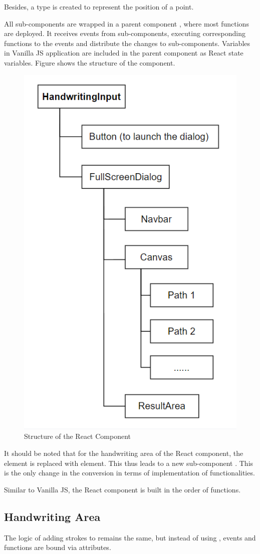 \documentclass[12pt,twoside]{report}
\begin{document}
Besides, a type  is created to represent the position of a point.

All sub-components are wrapped in a parent component ,
where most functions are deployed. It receives events from sub-components, executing corresponding functions to the events and distribute the changes to sub-components. Variables in Vanilla JS application are included in the parent component as React state variables.
Figure \label{fig:react-component-structure} shows the structure of the component.

\begin{figure}[h]
    \centering
    \includegraphics[width=0.6\linewidth]{figures/react-component-structure.png}
    \caption{Structure of the React Component}
    \label{fig:react-component-structure}
\end{figure}

It should be noted that for the handwriting area of the React component, the
 element is replaced with  element. This thus leads to a
new sub-component . This is the only change in the conversion in terms of implementation of functionalities. 

Similar to Vanilla JS, the React component is built in the order of functions.

\subsection*{Handwriting Area}
The logic of adding strokes to  remains the same, but instead of using , events and functions are bound via attributes. 
\end{document}
